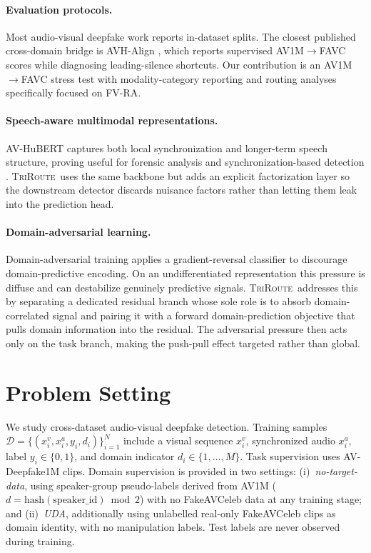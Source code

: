 \documentclass{article}
\newcommand{\method}{\textsc{TriRoute}}
\begin{document}
\paragraph{Evaluation protocols.}
Most audio-visual deepfake work reports in-dataset splits. The closest published cross-domain bridge is AVH-Align \citep{smeu2025avhalign}, which reports supervised AV1M$\rightarrow$FAVC scores while diagnosing leading-silence shortcuts. Our contribution is an AV1M$\rightarrow$FAVC stress test with modality-category reporting and routing analyses specifically focused on FV-RA.

\paragraph{Speech-aware multimodal representations.}
AV-HuBERT \citep{shi2022avhubert} captures both local synchronization and longer-term speech structure, proving useful for forensic analysis and synchronization-based detection \citep{liang2024speechforensics, smeu2025avhalign}. \method\ uses the same backbone but adds an explicit factorization layer so the downstream detector discards nuisance factors rather than letting them leak into the prediction head.

\paragraph{Domain-adversarial learning.}
Domain-adversarial training \citep{ganin2016dann} applies a gradient-reversal classifier to discourage domain-predictive encoding. On an undifferentiated representation this pressure is diffuse and can destabilize genuinely predictive signals. \method\ addresses this by separating a dedicated residual branch whose sole role is to absorb domain-correlated signal and pairing it with a forward domain-prediction objective that pulls domain information into the residual. The adversarial pressure then acts only on the task branch, making the push-pull effect targeted rather than global.

\section{Problem Setting}

We study cross-dataset audio-visual deepfake detection. Training samples $\mathcal{D} = \{(x_i^v, x_i^a, y_i, d_i)\}_{i=1}^N$ include a visual sequence $x_i^v$, synchronized audio $x_i^a$, label $y_i \in \{0,1\}$, and domain indicator $d_i \in \{1,\dots,M\}$. Task supervision uses AV-Deepfake1M clips. Domain supervision is provided in two settings: (i)~\emph{no-target-data}, using speaker-group pseudo-labels derived from AV1M ($d = \mathrm{hash}(\mathrm{speaker\_id})\bmod 2$) with no FakeAVCeleb data at any training stage; and (ii)~\emph{UDA}, additionally using unlabelled real-only FakeAVCeleb clips as domain identity, with no manipulation labels. Test labels are never observed during training.
\end{document}
